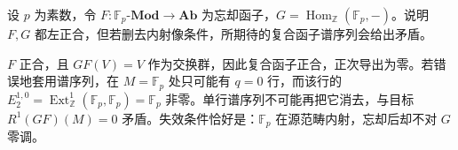 \begin{exercise}\label{b4:ex:15-missing-acyclic-hypothesis}
	设 \(p\) 为素数，令 \(F:\mathbb F_p\text{-}\mathbf{Mod}\to\mathbf{Ab}\) 为忘却函子，\(G=\operatorname{Hom}_{\mathbb Z}(\mathbb F_p,-)\)。说明 \(F,G\) 都左正合，但若删去内射像条件，所期待的复合函子谱序列会给出矛盾。
\end{exercise}
\begin{solution}
	\(F\) 正合，且 \(GF(V)=V\) 作为交换群，因此复合函子正合，正次导出为零。若错误地套用谱序列，在 \(M=\mathbb F_p\) 处只可能有 \(q=0\) 行，而该行的 \(E_2^{1,0}=\operatorname{Ext}_{\mathbb Z}^1(\mathbb F_p,\mathbb F_p)=\mathbb F_p\) 非零。单行谱序列不可能再把它消去，与目标 \(R^1(GF)(M)=0\) 矛盾。失效条件恰好是：\(\mathbb F_p\) 在源范畴内射，忘却后却不对 \(G\) 零调。
\end{solution}
